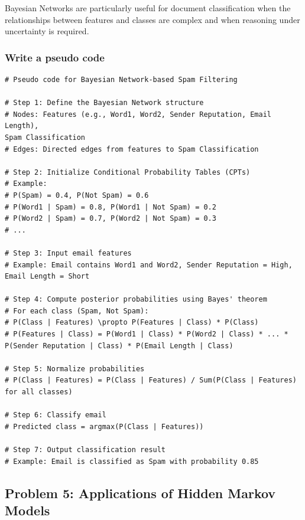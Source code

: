 \documentclass{article}
\begin{document}
Bayesian Networks are particularly useful for document classification when the relationships between features and classes are complex and when reasoning under uncertainty is required.

\subsubsection*{Write a pseudo code}
\begin{verbatim}
# Pseudo code for Bayesian Network-based Spam Filtering

# Step 1: Define the Bayesian Network structure
# Nodes: Features (e.g., Word1, Word2, Sender Reputation, Email Length), 
Spam Classification
# Edges: Directed edges from features to Spam Classification

# Step 2: Initialize Conditional Probability Tables (CPTs)
# Example:
# P(Spam) = 0.4, P(Not Spam) = 0.6
# P(Word1 | Spam) = 0.8, P(Word1 | Not Spam) = 0.2
# P(Word2 | Spam) = 0.7, P(Word2 | Not Spam) = 0.3
# ...

# Step 3: Input email features
# Example: Email contains Word1 and Word2, Sender Reputation = High, Email Length = Short

# Step 4: Compute posterior probabilities using Bayes' theorem
# For each class (Spam, Not Spam):
# P(Class | Features) \propto P(Features | Class) * P(Class)
# P(Features | Class) = P(Word1 | Class) * P(Word2 | Class) * ... * P(Sender Reputation | Class) * P(Email Length | Class)

# Step 5: Normalize probabilities
# P(Class | Features) = P(Class | Features) / Sum(P(Class | Features) for all classes)

# Step 6: Classify email
# Predicted class = argmax(P(Class | Features))

# Step 7: Output classification result
# Example: Email is classified as Spam with probability 0.85
\end{verbatim}
\clearpage

\subsection*{Problem 5: Applications of Hidden Markov Models}
\end{document}
